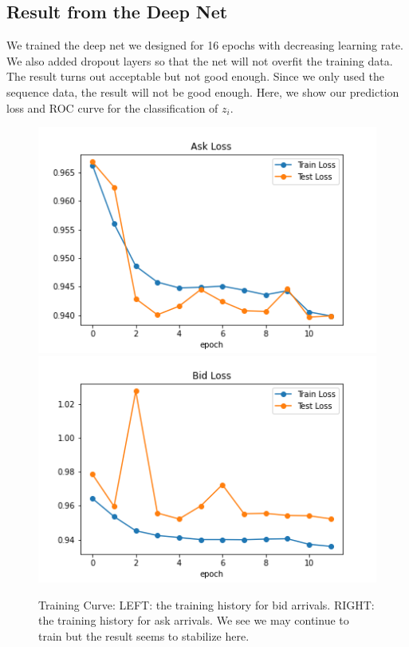 \documentclass[letterpaper,12pt]{article}
\numberwithin{equation}{section}
\begin{document}
\subsection{Result from the Deep Net}
We trained the deep net we designed for 16 epochs with decreasing learning rate. We also added dropout layers so that the net will not overfit the training data. The result turns out acceptable but not good enough. Since we only used the sequence data, the result will not be good enough. Here, we show our prediction loss and ROC curve for the classification of $z_i$. 

\begin{figure}
    \centering
    \includegraphics[scale = 0.5]{figs/Ask_Loss.png}
    \includegraphics[scale = 0.5]{figs/Bid_Loss.png}
    \caption{\small Training Curve: LEFT: the training history for bid arrivals. RIGHT: the training history for ask arrivals. We see we may continue to train but the result seems to stabilize here. }
    \label{sec2:fig:Loss}
\end{figure}
\end{document}

